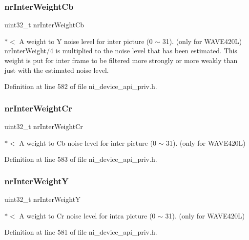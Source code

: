 \subsubsection{\texorpdfstring{nrInterWeightCb}{nrInterWeightCb}}
{\footnotesize\ttfamily uint32\+\_\+t nr\+Inter\+Weight\+Cb}

$\ast$$<$ A weight to Y noise level for inter picture (0 $\sim$ 31). (only for W\+A\+V\+E420L) nr\+Inter\+Weight/4 is multiplied to the noise level that has been estimated. This weight is put for inter frame to be filtered more strongly or more weakly than just with the estimated noise level. 

Definition at line 582 of file ni\+\_\+device\+\_\+api\+\_\+priv.\+h.

\mbox{\label{struct__ni__encoder__change__params__t_a74f5c8aec093eefb24e8c81971f560ab}} 
\subsubsection{\texorpdfstring{nrInterWeightCr}{nrInterWeightCr}}
{\footnotesize\ttfamily uint32\+\_\+t nr\+Inter\+Weight\+Cr}

$\ast$$<$ A weight to Cb noise level for inter picture (0 $\sim$ 31). (only for W\+A\+V\+E420L) 

Definition at line 583 of file ni\+\_\+device\+\_\+api\+\_\+priv.\+h.

\mbox{\label{struct__ni__encoder__change__params__t_a572ab28c94c7239c17d6ff712f24b892}} 
\subsubsection{\texorpdfstring{nrInterWeightY}{nrInterWeightY}}
{\footnotesize\ttfamily uint32\+\_\+t nr\+Inter\+WeightY}

$\ast$$<$ A weight to Cr noise level for intra picture (0 $\sim$ 31). (only for W\+A\+V\+E420L) 

Definition at line 581 of file ni\+\_\+device\+\_\+api\+\_\+priv.\+h.

